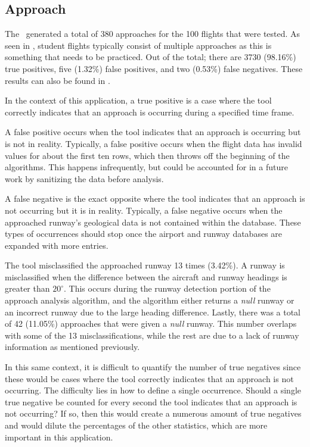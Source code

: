     
    \subsection{Approach}
    
        The \toolname\ generated a total of 380 approaches for the 100 flights that were tested. As seen in , student flights typically consist of multiple approaches as this is something that needs to be practiced.  Out of the total; there are 3730 (98.16\%) true positives, five (1.32\%) false positives, and two (0.53\%) false negatives.  These results can also be found in .
        
        In the context of this application, a true positive is a case where the tool correctly indicates that an approach is occurring during a specified time frame.
        
        A false positive occurs when the tool indicates that an approach is occurring but is not in reality.  Typically, a false positive occurs when the flight data has invalid values for about the first ten rows, which then throws off the beginning of the algorithms.  This happens infrequently, but could be accounted for in a future work by sanitizing the data before analysis.
        
        A false negative is the exact opposite where the tool indicates that an approach is not occurring but it is in reality.  Typically, a false negative occurs when the approached runway's geological data is not contained within the database.  These types of occurrences should stop once the airport and runway databases are expanded with more entries.
        
        The tool misclassified the approached runway 13 times (3.42\%).  A runway is misclassified when the difference between the aircraft and runway headings is greater than $20^\circ$.  This occurs during the runway detection portion of the approach analysis algorithm, and the algorithm either returns a \emph{null} runway or an incorrect runway due to the large heading difference.  Lastly, there was a total of 42 (11.05\%) approaches that were given a \textit{null} runway.  This number overlaps with some of the 13 misclassifications, while the rest are due to a lack of runway information as mentioned previously.

        In this same context, it is difficult to quantify the number of true negatives since these would be cases where the tool correctly indicates that an approach is not occurring.  The difficulty lies in how to define a single occurrence.  Should a single true negative be counted for every second the tool indicates that an approach is not occurring?  If so, then this would create a numerous amount of true negatives and would dilute the percentages of the other statistics, which are more important in this application.

